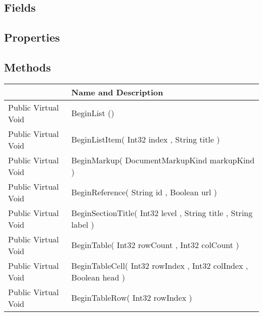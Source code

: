 \documentclass[11pt, oneside, a4paper]{book}
\begin{document}
\subsection{Fields}

\subsection{Properties}

\subsection{Methods}
\begin{center}
\begin{tabular}{| p{3cm} | p{12cm} | }
\hline
\textbf{ } & \textbf{ Name and Description}\\
\hline
 Public  Virtual  Void &  BeginList ()\hypertarget{SoftwareEngineeringTools.{}Documentation.{}HTMLGenerator.{}BeginList}{}\\
\hline
 Public  Virtual  Void &  BeginListItem(\hypertarget{SoftwareEngineeringTools.{}Documentation.{}HTMLGenerator.{}BeginListItem\_Int32\_String}{} Int32  index  ,  String  title  )\\
\hline
 Public  Virtual  Void &  BeginMarkup(\hypertarget{SoftwareEngineeringTools.{}Documentation.{}HTMLGenerator.{}BeginMarkup\_DocumentMarkupKind}{} DocumentMarkupKind  markupKind  )\\
\hline
 Public  Virtual  Void &  BeginReference(\hypertarget{SoftwareEngineeringTools.{}Documentation.{}HTMLGenerator.{}BeginReference\_String\_Boolean}{} String  id  ,  Boolean  url  )\\
\hline
 Public  Virtual  Void &  BeginSectionTitle(\hypertarget{SoftwareEngineeringTools.{}Documentation.{}HTMLGenerator.{}BeginSectionTitle\_Int32\_String\_String}{} Int32  level  ,  String  title  ,  String  label  )\\
\hline
 Public  Virtual  Void &  BeginTable(\hypertarget{SoftwareEngineeringTools.{}Documentation.{}HTMLGenerator.{}BeginTable\_Int32\_Int32}{} Int32  rowCount  ,  Int32  colCount  )\\
\hline
 Public  Virtual  Void &  BeginTableCell(\hypertarget{SoftwareEngineeringTools.{}Documentation.{}HTMLGenerator.{}BeginTableCell\_Int32\_Int32\_Boolean}{} Int32  rowIndex  ,  Int32  colIndex  ,  Boolean  head  )\\
\hline
 Public  Virtual  Void &  BeginTableRow(\hypertarget{SoftwareEngineeringTools.{}Documentation.{}HTMLGenerator.{}BeginTableRow\_Int32}{} Int32  rowIndex  )\\

\end{tabular}
\end{center}
\end{document}
